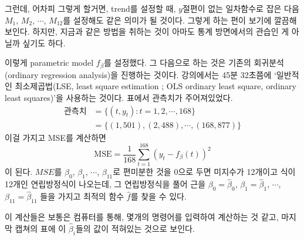 \documentclass{article}
\begin{document}
그런데, 어차피 그렇게 할거면, trend를 설정할 때, \(y\)절편이 없는 일차함수로 잡은 다음 \(M_1\), \(M_2\), \(\cdots\), \(M_{12}\)를 설정해도 같은 의미가 될 것이다.
그렇게 하는 편이 보기에 깔끔해보인다.
하지만, 지금과 같은 방법을 취하는 것이 아마도 통계 방면에서의 관습인 게 아닐까 싶기도 하다.

이렇게 parametric model \(f_\beta\)를 설정했다.
그 다음으로 하는 것은 기존의 회귀분석(ordinary regression analysis)을 진행하는 것이다.
강의에서는 45분 32초쯤에 `일반적인 최소제곱법(LSE, least square estimation ; OLS ordinary least square, ordinary least squares)'을 사용하는 것이다.
표에서 관측치가 주어져있었다.
\begin{align*}
\text{관측치}
&=\{(t,y_t):t=1,2,\cdots,168\}\\
&=\{(1,501), (2,488),\cdots,(168,877)\}
\end{align*}
이걸 가지고 MSE를 계산하면
\[\text{MSE}=\frac1{168}\sum_{t=1}^{168}\left(y_t-f_\beta(t)\right)^2\]
이 된다.
\(MSE\)를 \(\beta_0\), \(\beta_1\), \(\cdots\), \(\beta_{11}\)로 편미분한 것을 0으로 두면 미지수가 12개이고 식이 12개인 연립방정식이 나오는데, 그 연립방정식을 풀어 근을 \(\beta_0=\hat\beta_0\), \(\beta_1=\hat\beta_1\), \(\cdots\), \(\beta_{11}=\hat\beta_{11}\) 들을 가지고 최적의 함수 \(\hat f\)를 찾을 수 있다.

이 계산들은 보통은 컴퓨터를 통해, 몇개의 명령어를 입력하여 계산하는 것 같고, 마지막 캡쳐의 표에 이 \(\hat\beta_i\)들의 값이 적혀있는 것으로 보인다.

\end{document}

